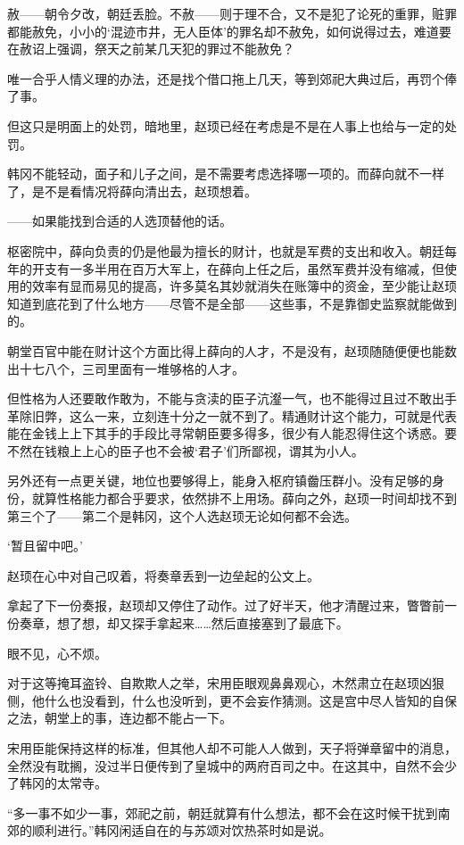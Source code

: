 赦——朝令夕改，朝廷丢脸。不赦——则于理不合，又不是犯了论死的重罪，赃罪都能赦免，小小的‘混迹市井，无人臣体’的罪名却不赦免，如何说得过去，难道要在赦诏上强调，祭天之前某几天犯的罪过不能赦免？

唯一合乎人情义理的办法，还是找个借口拖上几天，等到郊祀大典过后，再罚个俸了事。

但这只是明面上的处罚，暗地里，赵顼已经在考虑是不是在人事上也给与一定的处罚。

韩冈不能轻动，面子和儿子之间，是不需要考虑选择哪一项的。而薛向就不一样了，是不是看情况将薛向清出去，赵顼想着。

——如果能找到合适的人选顶替他的话。

枢密院中，薛向负责的仍是他最为擅长的财计，也就是军费的支出和收入。朝廷每年的开支有一多半用在百万大军上，在薛向上任之后，虽然军费并没有缩减，但使用的效率有显而易见的提高，许多莫名其妙就消失在账簿中的资金，至少能让赵顼知道到底花到了什么地方——尽管不是全部——这些事，不是靠御史监察就能做到的。

朝堂百官中能在财计这个方面比得上薛向的人才，不是没有，赵顼随随便便也能数出十七八个，三司里面有一堆够格的人才。

但性格为人还要敢作敢为，不能与贪渎的臣子沆瀣一气，也不能得过且过不敢出手革除旧弊，这么一来，立刻连十分之一就不到了。精通财计这个能力，可就是代表能在金钱上上下其手的手段比寻常朝臣要多得多，很少有人能忍得住这个诱惑。要不然在钱粮上上心的臣子也不会被‘君子’们所鄙视，谓其为小人。

另外还有一点更关键，地位也要够得上，能身入枢府镇齤压群小。没有足够的身份，就算性格能力都合乎要求，依然排不上用场。薛向之外，赵顼一时间却找不到第三个了——第二个是韩冈，这个人选赵顼无论如何都不会选。

‘暂且留中吧。’

赵顼在心中对自己叹着，将奏章丢到一边垒起的公文上。

拿起了下一份奏报，赵顼却又停住了动作。过了好半天，他才清醒过来，瞥瞥前一份奏章，想了想，却又探手拿起来……然后直接塞到了最底下。

眼不见，心不烦。

对于这等掩耳盗铃、自欺欺人之举，宋用臣眼观鼻鼻观心，木然肃立在赵顼凶狠侧，他什么也没看到，什么也没听到，更不会妄作猜测。这是宫中尽人皆知的自保之法，朝堂上的事，连边都不能占一下。

宋用臣能保持这样的标准，但其他人却不可能人人做到，天子将弹章留中的消息，全然没有耽搁，没过半日便传到了皇城中的两府百司之中。在这其中，自然不会少了韩冈的太常寺。

“多一事不如少一事，郊祀之前，朝廷就算有什么想法，都不会在这时候干扰到南郊的顺利进行。”韩冈闲适自在的与苏颂对饮热茶时如是说。

